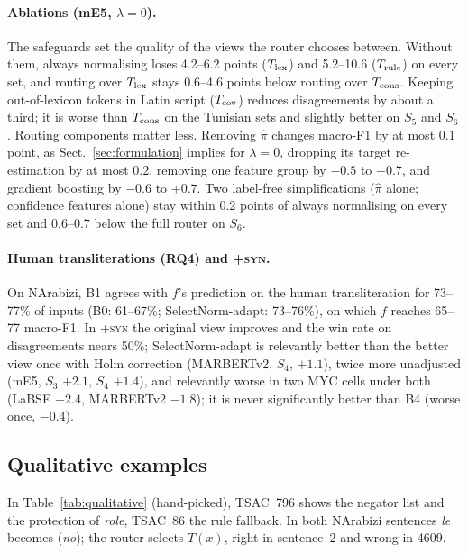 \label{sec:normaliser}
\paragraph{Ablations (mE5, $\lambda=0$).} The safeguards set the quality of the views the router chooses between. Without them, always normalising loses 4.2--6.2 points ($T_{\rm lex}$) and 5.2--10.6 ($T_{\rm rule}$) on every set, and routing over $T_{\rm lex}$ stays 0.6--4.6 points below routing over $T_{\rm cons}$. Keeping out-of-lexicon tokens in Latin script ($T_{\rm cov}$) reduces disagreements by about a third; it is worse than $T_{\rm cons}$ on the Tunisian sets and slightly better on $S_5$ and $S_6$. Routing components matter less. Removing $\hat\pi$ changes macro-F1 by at most 0.1 point, as Sect.~\ref{sec:formulation} implies for $\lambda=0$, dropping its target re-estimation by at most 0.2, removing one feature group by $-0.5$ to $+0.7$, and gradient boosting by $-0.6$ to $+0.7$. Two label-free simplifications ($\hat\pi$ alone; confidence features alone) stay within 0.2 points of always normalising on every set and 0.6--0.7 below the full router on $S_6$. \paragraph{Human transliterations (RQ4) and \textsc{+syn}.} On NArabizi, B1 agrees with $f$'s prediction on the human transliteration for 73--77\% of inputs (B0: 61--67\%; SelectNorm-adapt: 73--76\%), on which $f$ reaches 65--77 macro-F1. In \textsc{+syn} the original view improves and the win rate on disagreements nears 50\%; SelectNorm-adapt is relevantly better than the better view once with Holm correction (MARBERTv2, $S_4$, $+1.1$), twice more unadjusted (mE5, $S_3$ $+2.1$, $S_4$ $+1.4$), and relevantly worse in two MYC cells under both (LaBSE $-2.4$, MARBERTv2 $-1.8$); it is never significantly better than B4 (worse once, $-0.4$).

\subsection{Qualitative examples}
\label{sec:qualitative}

In Table~\ref{tab:qualitative} (hand-picked), TSAC~796 shows the negator list and the protection of \textit{role}, TSAC~86 the rule fallback. In both NArabizi sentences \textit{le} becomes  (\textit{no}); the router selects $T(x)$, right in sentence~2 and wrong in 4609.
